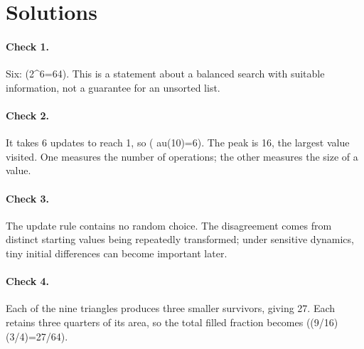 \documentclass[11pt,letterpaper]{article}
\begin{document}
\clearpage
{\small\setlength{\parskip}{3pt}\section*{Solutions}

\paragraph{Check 1.}
Six: (2\textasciicircum{}6=64). This is a statement about a balanced search with suitable information, not a guarantee for an unsorted list.


\paragraph{Check 2.}
It takes 6 updates to reach 1, so (	au(10)=6). The peak is 16, the largest value visited. One measures the number of operations; the other measures the size of a value.


\paragraph{Check 3.}
The update rule contains no random choice. The disagreement comes from distinct starting values being repeatedly transformed; under sensitive dynamics, tiny initial differences can become important later.


\paragraph{Check 4.}
Each of the nine triangles produces three smaller survivors, giving 27. Each retains three quarters of its area, so the total filled fraction becomes ((9/16)(3/4)=27/64).



}
\end{document}
